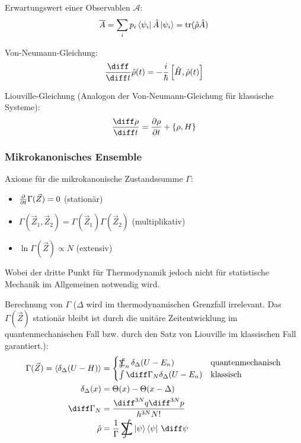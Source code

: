 \documentclass[11pt]{article}
\DeclareMathOperator*{\SumInt}{%
\mathchoice%
  {\ooalign{$\displaystyle\sum$\cr\hidewidth$\displaystyle\int$\hidewidth\cr}}
  {\ooalign{\raisebox{.14\height}{\scalebox{.7}{$\textstyle\sum$}}\cr\hidewidth$\textstyle\int$\hidewidth\cr}}
  {\ooalign{\raisebox{.2\height}{\scalebox{.6}{$\scriptstyle\sum$}}\cr$\scriptstyle\int$\cr}}
  {\ooalign{\raisebox{.2\height}{\scalebox{.6}{$\scriptstyle\sum$}}\cr$\scriptstyle\int$\cr}}
}
\numberwithin{equation}{section}
\begin{document}
          Erwartungswert einer Observablen $\mathcal{A}$:
          \begin{equation}
            \overline{A} = \sum_i p_i \Bra{\psi_i}\hat{A}\Ket{\psi_i} = \mathrm{tr} (\hat{\rho}\hat{A})
          \end{equation}

          Von-Neumann-Gleichung:
          \begin{equation}
            \tder{}{t}\hat{\rho}(t) = -\frac{i}{\hbar} \com{\hat{H}}{\hat{\rho}(t)}
          \end{equation}

          Liouville-Gleichung (Analogon der Von-Neumann-Gleichung für klassische Systeme):
          \begin{equation}
            \tder{\rho}{t} = \pder{\rho}{t}+\cBr{\rho,H}
          \end{equation}

        \subsubsection{Mikrokanonisches Ensemble}
          Axiome für die mikrokanonische Zustandssumme $\Gamma$:
          \begin{itemize}\itemsep -0pt  %
            \item $\frac{\partial }{\partial t}\Gamma(\vec{Z}) = 0$ \hfill{(stationär)}
            \item $\Gamma(\vec{Z}_1,\vec{Z}_2) = \Gamma(\vec{Z}_1)\Gamma(\vec{Z}_2) $ \hfill{(multiplikativ)}
            \item $\ln\Gamma(\vec{Z}) \propto N$ \hfill{(extensiv)}
          \end{itemize}
          Wobei der dritte Punkt für Thermodynamik jedoch nicht für statistische Mechanik im Allgemeinen notwendig wird.

          Berechnung von $\Gamma$ ($\Delta$ wird im thermodynamischen Grenzfall irrelevant. Das $\Gamma(\vec{Z})$ stationär bleibt ist durch die unitäre Zeitentwicklung im quantenmechanischen Fall bzw. durch den Satz von Liouville im klassischen Fall garantiert.):
          \begin{equation}
            \begin{aligned}
              \Gamma(\vec{Z}) = \langle \delta_\Delta (U-H) \rangle
                &= \begin{cases}
                    \SumInt_n \delta_\Delta(U-E_n) & \text{quantenmechanisch} \\
                    \int \diff \Gamma_N \delta_\Delta(U-E_n) & \text{klassisch}
                  \end{cases} \\
              \delta_\Delta(x) &= \Theta(x) - \Theta(x-\Delta)\\
              \diff \Gamma_N &= \frac{\diff^{3N}q \diff^{3N}p }{h^{3N} N!} \\
              \hat{\rho} &= \frac{1}{\Gamma} \SumInt \Ket{\psi}\Bra{\psi}\,\diff\psi
            \end{aligned}
          \end{equation}
\end{document}
